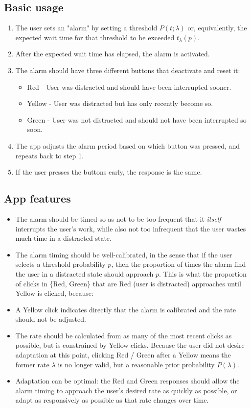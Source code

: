 \documentclass{article}
\begin{document}
\subsection{Basic usage}
\begin{enumerate}
\item The user sets an "alarm" by setting a threshold $P(t;\lambda)$ or, equivalently, the expected wait time for that threshold to be exceeded $t_\lambda(p)$.
\item After the expected wait time has elapsed, the alarm is activated.
\item The alarm should have three different buttons that deactivate and reset it:
\begin{itemize}
\item Red - User was distracted and should have been interrupted sooner.
\item Yellow - User was distracted but has only recently become so.
\item Green - User was not distracted and should not have been interrupted so soon.
\end{itemize}
\item The app adjusts the alarm period based on which button was pressed, and repeats back to step 1.
\item If the user presses the buttons early, the response is the same.
\end{enumerate}
\subsection{App features}
\begin{itemize}
\item The alarm should be timed so as not to be too frequent that it \emph{itself} interrupts the user's work, while also not too infrequent that the user wastes much time in a distracted state.
\item The alarm timing should be well-calibrated, in the sense that if the user selects a threshold probability $p$, then the proportion of times the alarm find the user in a distracted state should approach $p$.  This is what the proportion of clicks in \{Red, Green\} that are Red (user is distracted) approaches until Yellow is clicked, because:
\item A Yellow click indicates directly that the alarm is calibrated and the rate should not be adjusted.
\item The rate should be calculated from as many of the most recent clicks as possible, but is constrained by Yellow clicks.  Because the user did not desire adaptation at this point, clicking Red / Green after a Yellow means the former rate $\lambda$ is no longer valid, but a reasonable prior probability $P(\lambda)$.


\item Adaptation can be optimal:  the Red and Green responses should allow the alarm timing to approach the user's desired rate as quickly as possible, or adapt as responsively as possible as that rate changes over time.
\end{itemize}
\end{document}

